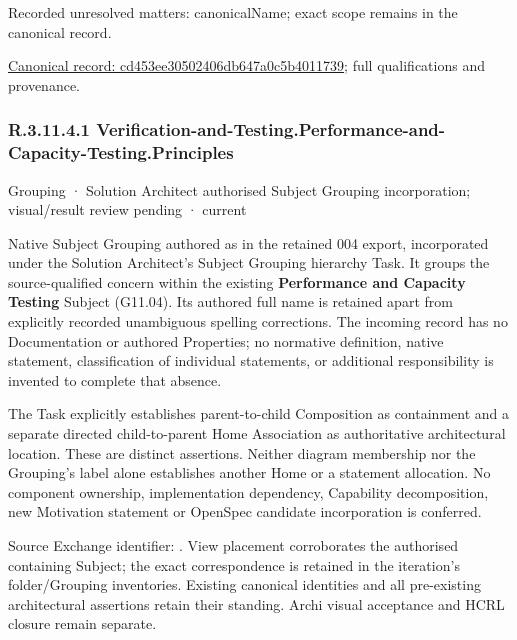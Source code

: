 {\small Recorded unresolved matters: canonicalName; exact scope remains in the canonical record.}\par
{\footnotesize \href{../../../../continuum/grouping/cd453ee30502406db647a0c5b4011739.md}{Canonical record: cd453ee30502406db647a0c5b4011739}; full qualifications and provenance.}\par
\subsubsection*{R.3.11.4.1 Verification-and-Testing.Performance-and-Capacity-Testing.Principles}
\label{navigation:R.3.11.4.1}

\label{element:582e15cf43f94ce6b1c128361ec31780}
{\small Grouping · Solution Architect authorised Subject Grouping incorporation; visual/result review pending · current}\par

Native Subject Grouping authored as \texttt{} in the retained 004 export,
incorporated under the Solution Architect's Subject Grouping hierarchy Task.
It groups the source-qualified \texttt{} concern within
the existing \textbf{Performance and Capacity Testing} Subject (G11.04). Its authored full name
is retained apart from explicitly recorded unambiguous spelling corrections.
The incoming record has no Documentation or authored Properties; no normative
definition, native statement, classification of individual statements, or
additional responsibility is invented to complete that absence.



The Task explicitly establishes parent-to-child Composition as containment and
a separate directed child-to-parent Home Association as authoritative architectural
location. These are distinct assertions. Neither diagram membership nor the
Grouping's label alone establishes another Home or a statement allocation.
No component ownership, implementation dependency, Capability decomposition,
new Motivation statement or OpenSpec candidate incorporation is conferred.



Source Exchange identifier: \texttt{}. View placement corroborates
the authorised containing Subject; the exact correspondence is retained in the
iteration's folder/Grouping inventories. Existing canonical identities and all
pre-existing architectural assertions retain their standing. Archi visual
acceptance and HCRL closure remain separate.


